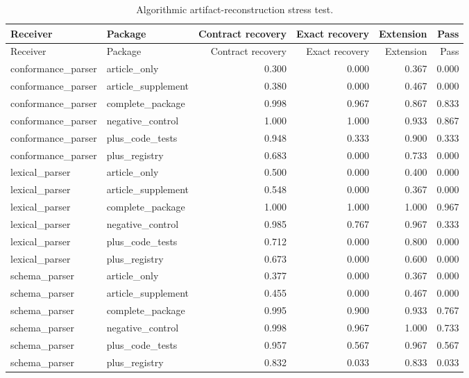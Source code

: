 \begin{longtable}{p{}p{}rrrr}
\caption{Algorithmic artifact-reconstruction stress test.}\label{tab:prop}\\
\toprule Receiver & Package & Contract recovery & Exact recovery & Extension & Pass \\ \midrule \endfirsthead
\toprule Receiver & Package & Contract recovery & Exact recovery & Extension & Pass \\ \midrule \endhead
conformance\_parser & article\_only & 0.300 & 0.000 & 0.367 & 0.000 \\
conformance\_parser & article\_supplement & 0.380 & 0.000 & 0.467 & 0.000 \\
conformance\_parser & complete\_package & 0.998 & 0.967 & 0.867 & 0.833 \\
conformance\_parser & negative\_control & 1.000 & 1.000 & 0.933 & 0.867 \\
conformance\_parser & plus\_code\_tests & 0.948 & 0.333 & 0.900 & 0.333 \\
conformance\_parser & plus\_registry & 0.683 & 0.000 & 0.733 & 0.000 \\
lexical\_parser & article\_only & 0.500 & 0.000 & 0.400 & 0.000 \\
lexical\_parser & article\_supplement & 0.548 & 0.000 & 0.367 & 0.000 \\
lexical\_parser & complete\_package & 1.000 & 1.000 & 1.000 & 0.967 \\
lexical\_parser & negative\_control & 0.985 & 0.767 & 0.967 & 0.333 \\
lexical\_parser & plus\_code\_tests & 0.712 & 0.000 & 0.800 & 0.000 \\
lexical\_parser & plus\_registry & 0.673 & 0.000 & 0.600 & 0.000 \\
schema\_parser & article\_only & 0.377 & 0.000 & 0.367 & 0.000 \\
schema\_parser & article\_supplement & 0.455 & 0.000 & 0.467 & 0.000 \\
schema\_parser & complete\_package & 0.995 & 0.900 & 0.933 & 0.767 \\
schema\_parser & negative\_control & 0.998 & 0.967 & 1.000 & 0.733 \\
schema\_parser & plus\_code\_tests & 0.957 & 0.567 & 0.967 & 0.567 \\
schema\_parser & plus\_registry & 0.832 & 0.033 & 0.833 & 0.033 \\
\bottomrule
\end{longtable}
